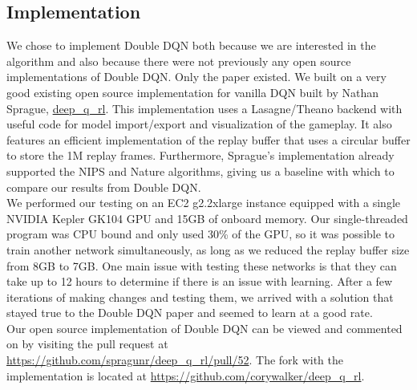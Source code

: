 \documentclass{article}
\begin{document}
\subsection{Implementation}
  We chose to implement Double DQN both because we are interested in the algorithm and also because there were not previously any open source implementations of Double DQN. Only the paper existed. We built on a very good existing open source implementation for vanilla DQN built by Nathan Sprague, \href{https://github.com/spragunr/deep_q_rl}{deep\_q\_rl}. This implementation uses a Lasagne/Theano backend with useful code for model import/export and visualization of the gameplay. It also features an efficient implementation of the replay buffer that uses a circular buffer to store the 1M replay frames. Furthermore, Sprague's implementation already supported the NIPS and Nature algorithms, giving us a baseline with which to compare our results from Double DQN. \\

We performed our testing on an EC2 g2.2xlarge instance equipped with a single NVIDIA Kepler GK104 GPU and 15GB of onboard memory. Our single-threaded program was CPU bound and only used 30\% of the GPU, so it was possible to train another network simultaneously, as long as we reduced the replay buffer size from 8GB to 7GB. One main issue with testing these networks is that they can take up to 12 hours to determine if there is an issue with learning. After a few iterations of making changes and testing them, we arrived with a solution that stayed true to the Double DQN paper and seemed to learn at a good rate. \\

Our open source implementation of Double DQN can be viewed and commented on by visiting the pull request at \href{https://github.com/spragunr/deep_q_rl/pull/52}{https://github.com/spragunr/deep\_q\_rl/pull/52}. The fork with the implementation is located at \href{https://github.com/corywalker/deep_q_rl}{https://github.com/corywalker/deep\_q\_rl}.
\end{document}
